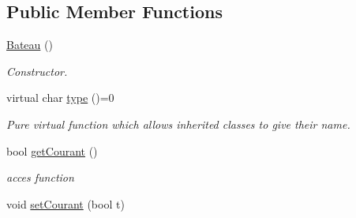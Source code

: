 \subsection*{Public Member Functions}
\begin{DoxyCompactItemize}
\item 
\hypertarget{class_bateau_a9b2027f6f3a71d6b05209e22b928db00}{
\hyperlink{class_bateau_a9b2027f6f3a71d6b05209e22b928db00}{Bateau} ()}
\label{class_bateau_a9b2027f6f3a71d6b05209e22b928db00}

\begin{DoxyCompactList}\small\item\em Constructor. \item\end{DoxyCompactList}\item 
virtual char \hyperlink{class_bateau_ad6775916a45ddbe18a9f06df79e2ba6f}{type} ()=0
\begin{DoxyCompactList}\small\item\em Pure virtual function which allows inherited classes to give their name. \item\end{DoxyCompactList}\item 
bool \hyperlink{class_bateau_a3e257c2b988a544cd37889165ac6f5f8}{getCourant} ()
\begin{DoxyCompactList}\small\item\em acces function \item\end{DoxyCompactList}\item 
\hypertarget{class_bateau_ace593e482febbc5bc117388e812e2891}{
void \hyperlink{class_bateau_ace593e482febbc5bc117388e812e2891}{setCourant} (bool t)}
\label{class_bateau_ace593e482febbc5bc117388e812e2891}


\end{DoxyCompactItemize}

